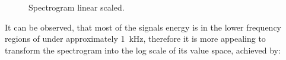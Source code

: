 \begin{figure}[!ht]
  \centering
  \caption{Spectrogram linear scaled.}
  \label{fig:signal_spec_lin_showcase}
\end{figure}
\FloatBarrier
\noindent
It can be observed, that most of the signals energy is in the lower frequency regions of under approximately \SI{1}{\kilo\hertz}, therefore it is more appealing to transform the spectrogram into the log scale of its value space, achieved by:
